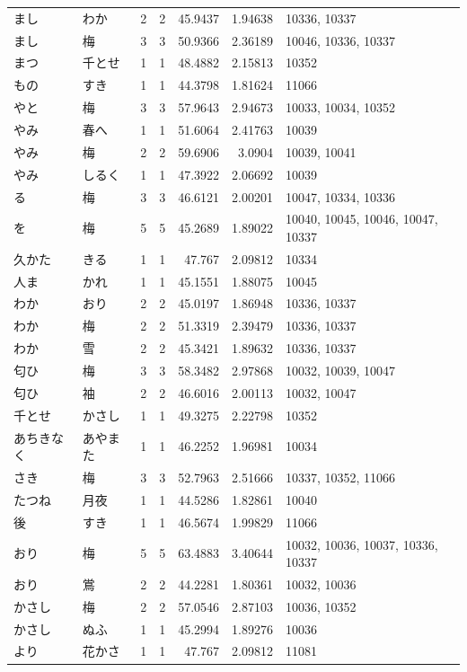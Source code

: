 \begin{tabular}{llrrrrl}
まし & わか & 2 & 2 & 45.9437 & 1.94638 & 10336, 10337 \\
まし & 梅 & 3 & 3 & 50.9366 & 2.36189 & 10046, 10336, 10337 \\
まつ & 千とせ & 1 & 1 & 48.4882 & 2.15813 & 10352 \\
もの & すき & 1 & 1 & 44.3798 & 1.81624 & 11066 \\
やと & 梅 & 3 & 3 & 57.9643 & 2.94673 & 10033, 10034, 10352 \\
やみ & 春へ & 1 & 1 & 51.6064 & 2.41763 & 10039 \\
やみ & 梅 & 2 & 2 & 59.6906 & 3.0904 & 10039, 10041 \\
やみ & しるく & 1 & 1 & 47.3922 & 2.06692 & 10039 \\
る & 梅 & 3 & 3 & 46.6121 & 2.00201 & 10047, 10334, 10336 \\
を & 梅 & 5 & 5 & 45.2689 & 1.89022 & 10040, 10045, 10046, 10047, 10337 \\
久かた & きる & 1 & 1 & 47.767 & 2.09812 & 10334 \\
人ま & かれ & 1 & 1 & 45.1551 & 1.88075 & 10045 \\
わか & おり & 2 & 2 & 45.0197 & 1.86948 & 10336, 10337 \\
わか & 梅 & 2 & 2 & 51.3319 & 2.39479 & 10336, 10337 \\
わか & 雪 & 2 & 2 & 45.3421 & 1.89632 & 10336, 10337 \\
匂ひ & 梅 & 3 & 3 & 58.3482 & 2.97868 & 10032, 10039, 10047 \\
匂ひ & 袖 & 2 & 2 & 46.6016 & 2.00113 & 10032, 10047 \\
千とせ & かさし & 1 & 1 & 49.3275 & 2.22798 & 10352 \\
あちきなく & あやまた & 1 & 1 & 46.2252 & 1.96981 & 10034 \\
さき & 梅 & 3 & 3 & 52.7963 & 2.51666 & 10337, 10352, 11066 \\
たつね & 月夜 & 1 & 1 & 44.5286 & 1.82861 & 10040 \\
後 & すき & 1 & 1 & 46.5674 & 1.99829 & 11066 \\
おり & 梅 & 5 & 5 & 63.4883 & 3.40644 & 10032, 10036, 10037, 10336, 10337 \\
おり & 鴬 & 2 & 2 & 44.2281 & 1.80361 & 10032, 10036 \\
かさし & 梅 & 2 & 2 & 57.0546 & 2.87103 & 10036, 10352 \\
かさし & ぬふ & 1 & 1 & 45.2994 & 1.89276 & 10036 \\
より & 花かさ & 1 & 1 & 47.767 & 2.09812 & 11081 \\

\end{tabular}
